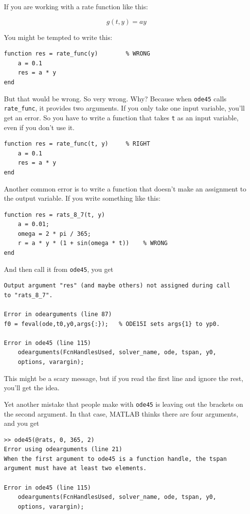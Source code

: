 \documentclass{book}
\begin{document}
If you are working with a rate function like this:

\[ g(t, y) = a y \]

You might be tempted to write this:

\begin{verbatim}
function res = rate_func(y)        % WRONG
    a = 0.1
    res = a * y
end
\end{verbatim}

But that would be wrong.  So very wrong.  Why?  Because
when {\tt ode45} calls {\tt rate\_func}, it provides two arguments.
If you only take one input variable, you'll get an error.  So
you have to write a function that takes {\tt t} as an input
variable, even if you don't use it.

\begin{verbatim}
function res = rate_func(t, y)     % RIGHT
    a = 0.1
    res = a * y
end
\end{verbatim}

Another common error is to write a function that doesn't make
an assignment to the output variable.  If you write something
like this:

\begin{verbatim}
function res = rats_8_7(t, y)
    a = 0.01;
    omega = 2 * pi / 365;
    r = a * y * (1 + sin(omega * t))    % WRONG
end
\end{verbatim}

And then call it from {\tt ode45}, you get

\begin{verbatim}
Output argument "res" (and maybe others) not assigned during call
to "rats_8_7".

Error in odearguments (line 87)
f0 = feval(ode,t0,y0,args{:});   % ODE15I sets args{1} to yp0.

Error in ode45 (line 115)
    odearguments(FcnHandlesUsed, solver_name, ode, tspan, y0, 
    options, varargin);
\end{verbatim}

This might be a scary message, but if you read the first line
and ignore the rest, you'll get the idea.

Yet another mistake that people make with {\tt ode45} is leaving
out the brackets on the second argument.  In that case, MATLAB
thinks there are four arguments, and you get

\begin{verbatim}
>> ode45(@rats, 0, 365, 2)
Error using odearguments (line 21)
When the first argument to ode45 is a function handle, the tspan
argument must have at least two elements.

Error in ode45 (line 115)
    odearguments(FcnHandlesUsed, solver_name, ode, tspan, y0, 
    options, varargin);
\end{verbatim}
\end{document}
